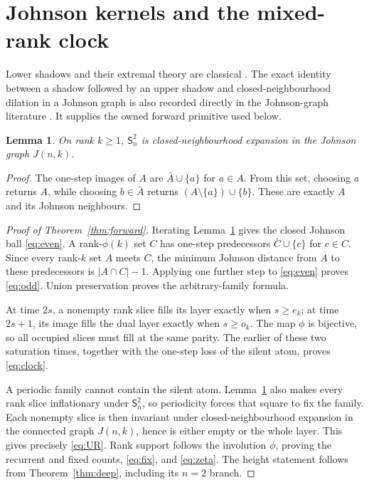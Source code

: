 \documentclass[a4paper,10pt]{amsart}
\newtheorem{lemma}[theorem]{Lemma}
\newcommand{\cS}{\mathsf S}
\begin{document}
\section{Johnson kernels and the mixed-rank clock}

Lower shadows and their extremal theory are classical
\citep{kruskal1963,katona2009}.  The exact identity between a shadow followed
by an upper shadow and closed-neighbourhood dilation in a Johnson graph is
also recorded directly in the Johnson-graph literature \citep{diego2018}.
It supplies the owned forward primitive used below.

\begin{lemma}\label{lem:square}
On rank $k\geq1$, $\cS_n^2$ is closed-neighbourhood expansion in the Johnson
graph $J(n,k)$.
\end{lemma}

\begin{proof}
The one-step images of $A$ are $\bar A\cup\{a\}$ for $a\in A$.  From this
set, choosing $a$ returns $A$, while choosing $b\in\bar A$ returns
$(A\setminus\{a\})\cup\{b\}$.  These are exactly $A$ and its Johnson
neighbours.
\end{proof}

\begin{proof}[Proof of Theorem~\ref{thm:forward}]
Iterating Lemma~\ref{lem:square} gives the closed Johnson ball
\eqref{eq:even}.  A rank-$\phi(k)$ set $C$ has one-step predecessors
$\bar C\cup\{c\}$ for $c\in C$.  Since every rank-$k$ set $A$ meets $C$,
the minimum Johnson distance from $A$ to these predecessors is
$|A\cap C|-1$.  Applying one further step to \eqref{eq:even} proves
\eqref{eq:odd}.  Union preservation proves the arbitrary-family formula.

At time $2s$, a nonempty rank slice fills its layer exactly when
$s\geq e_k$; at time $2s+1$, its image fills the dual layer exactly when
$s\geq o_k$.  The map $\phi$ is bijective, so all occupied slices must fill
at the same parity.  The earlier of these two saturation times, together with
the one-step loss of the silent atom, proves \eqref{eq:clock}.

A periodic family cannot contain the silent atom.  Lemma~\ref{lem:square}
also makes every rank slice inflationary under $\cS_n^2$, so periodicity
forces that square to fix the family.  Each nonempty slice is then invariant
under closed-neighbourhood expansion in the connected graph $J(n,k)$, hence
is either empty or the whole layer.  This gives precisely \eqref{eq:UR}.
Rank support follows the involution $\phi$, proving the recurrent and fixed
counts, \eqref{eq:fix}, and \eqref{eq:zeta}.  The height statement follows
from Theorem~\ref{thm:deep}, including its $n=2$ branch.
\end{proof}
\end{document}
